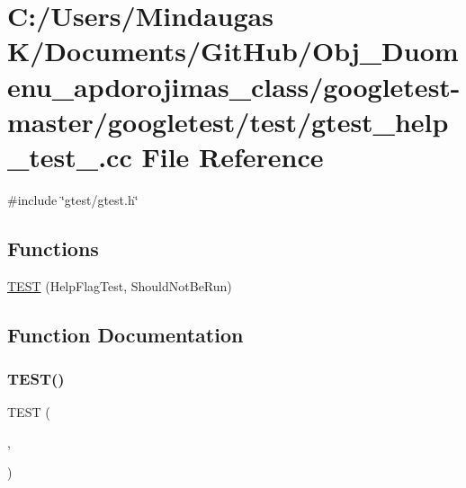 \hypertarget{googletest-master_2googletest_2test_2gtest__help__test___8cc}{}\section{C\+:/\+Users/\+Mindaugas K/\+Documents/\+Git\+Hub/\+Obj\+\_\+\+Duomenu\+\_\+apdorojimas\+\_\+class/googletest-\/master/googletest/test/gtest\+\_\+help\+\_\+test\+\_\+.cc File Reference}
\label{googletest-master_2googletest_2test_2gtest__help__test___8cc}
{\ttfamily \#include \char`\"{}gtest/gtest.\+h\char`\"{}}\newline
\subsection*{Functions}
\begin{DoxyCompactItemize}
\item 
\mbox{\hyperlink{googletest-master_2googletest_2test_2gtest__help__test___8cc_add505cb10a4fda179911b3f349ff9696}{T\+E\+ST}} (Help\+Flag\+Test, Should\+Not\+Be\+Run)
\end{DoxyCompactItemize}


\subsection{Function Documentation}
\mbox{\label{googletest-master_2googletest_2test_2gtest__help__test___8cc_add505cb10a4fda179911b3f349ff9696}} 
\subsubsection{\texorpdfstring{TEST()}{TEST()}}
{\footnotesize\ttfamily T\+E\+ST (\begin{DoxyParamCaption}\item[{Help\+Flag\+Test}]{,  }\item[{Should\+Not\+Be\+Run}]{ }\end{DoxyParamCaption})}


